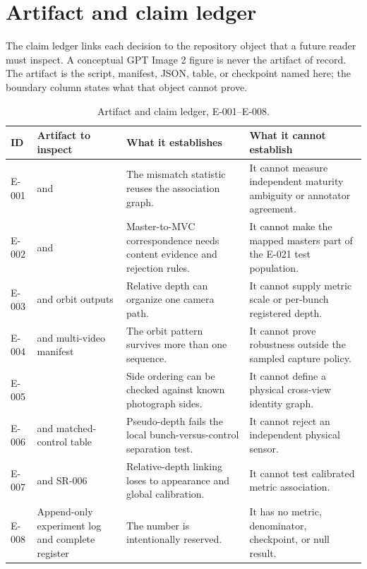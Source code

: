 \section{Artifact and claim ledger}
\label{app:artifact-ledger}
The claim ledger links each decision to the repository object that a future
reader must inspect. A conceptual GPT Image 2 figure is never the artifact of
record. The artifact is the script, manifest, JSON, table, or checkpoint named
here; the boundary column states what that object cannot prove.

\begin{table}[t]
\centering\small
\caption{Artifact and claim ledger, E-001--E-008.}
\begin{tabularx}{\textwidth}{L{0.07\textwidth}L{0.29\textwidth}Y Y}
\toprule
\textbf{ID} & \textbf{Artifact to inspect} & \textbf{What it establishes} & \textbf{What it cannot establish}\\
\midrule
E-001 &  and  & The mismatch statistic reuses the association graph. & It cannot measure independent maturity ambiguity or annotator agreement.\\
E-002 &  and  & Master-to-MVC correspondence needs content evidence and rejection rules. & It cannot make the mapped masters part of the E-021 test population.\\
E-003 &  and orbit outputs & Relative depth can organize one camera path. & It cannot supply metric scale or per-bunch registered depth.\\
E-004 &  and multi-video manifest & The orbit pattern survives more than one sequence. & It cannot prove robustness outside the sampled capture policy.\\
E-005 &  & Side ordering can be checked against known photograph sides. & It cannot define a physical cross-view identity graph.\\
E-006 &  and matched-control table & Pseudo-depth fails the local bunch-versus-control separation test. & It cannot reject an independent physical sensor.\\
E-007 &  and SR-006 & Relative-depth linking loses to appearance and global calibration. & It cannot test calibrated metric association.\\
E-008 & Append-only experiment log and complete register & The number is intentionally reserved. & It has no metric, denominator, checkpoint, or null result.\\
\bottomrule
\end{tabularx}
\end{table}

